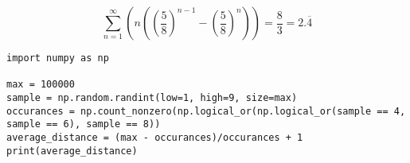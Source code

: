 \documentclass{article}
\begin{document}
\huge
 $$\sum_{n=1}^{\infty} 
\left(n\left(\left(\frac{5}{8}\right)^{n-1} - 
\left(\frac{5}{8}\right)^{n}\right)\right) = \frac{8}{3} = 2.\overline{4}$$




\begin{lstlisting}
import numpy as np

max = 100000
sample = np.random.randint(low=1, high=9, size=max)
occurances = np.count_nonzero(np.logical_or(np.logical_or(sample == 4, sample == 6), sample == 8))
average_distance = (max - occurances)/occurances + 1
print(average_distance)
\end{lstlisting}
\end{document}
